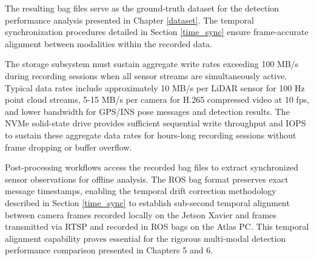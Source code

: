 The resulting bag files serve as the ground-truth dataset for the detection performance analysis presented in Chapter \ref{dataset}.
The temporal synchronization procedures detailed in Section \ref{time_sync} ensure frame-accurate alignment between modalities within the recorded data.

The storage subsystem must sustain aggregate write rates exceeding 100 MB/s during recording sessions when all sensor streams are simultaneously active.
Typical data rates include approximately 10 MB/s per LiDAR sensor for 100 Hz point cloud streams, 5-15 MB/s per camera for H.265 compressed video at 10 fps, and lower bandwidth for GPS/INS pose messages and detection results.
The NVMe solid-state drive provides sufficient sequential write throughput and IOPS to sustain these aggregate data rates for hours-long recording sessions without frame dropping or buffer overflow.

Post-processing workflows access the recorded bag files to extract synchronized sensor observations for offline analysis.
The ROS bag format preserves exact message timestamps, enabling the temporal drift correction methodology described in Section \ref{time_sync} to establish sub-second temporal alignment between camera frames recorded locally on the Jetson Xavier and frames transmitted via RTSP and recorded in ROS bags on the Atlas PC.
This temporal alignment capability proves essential for the rigorous multi-modal detection performance comparison presented in Chapters 5 and 6.


